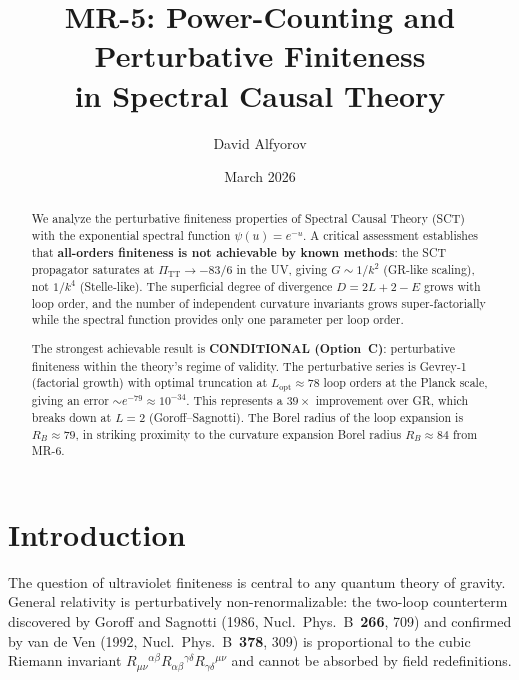 \documentclass[12pt,a4paper]{article}
\title{\textbf{MR-5: Power-Counting and Perturbative Finiteness\\
in Spectral Causal Theory}}
\author{David Alfyorov}
\date{March 2026}
\begin{document}
\maketitle
\begin{center}
\end{center}

\begin{abstract}
We analyze the perturbative finiteness properties of Spectral Causal Theory (SCT)
with the exponential spectral function $\psi(u) = e^{-u}$. A critical assessment
establishes that \textbf{all-orders finiteness is not achievable by known methods}:
the SCT propagator saturates at $\Pi_{\mathrm{TT}} \to -83/6$ in the UV, giving
$G \sim 1/k^2$ (GR-like scaling), not $1/k^4$ (Stelle-like). The superficial
degree of divergence $D = 2L + 2 - E$ grows with loop order, and the number of
independent curvature invariants grows super-factorially while the spectral
function provides only one parameter per loop order.

The strongest achievable result is \textbf{CONDITIONAL (Option~C)}: perturbative
finiteness within the theory's regime of validity. The perturbative series is
Gevrey-1 (factorial growth) with optimal truncation at $L_{\mathrm{opt}} \approx 78$
loop orders at the Planck scale, giving an error $\sim e^{-79} \approx 10^{-34}$.
This represents a $39\times$ improvement over GR, which breaks down at $L = 2$
(Goroff--Sagnotti). The Borel radius of the loop expansion is
$R_B \approx 79$, in striking proximity to the curvature expansion Borel
radius $R_B \approx 84$ from MR-6.
\end{abstract}

\tableofcontents
\newpage

\section{Introduction}
\label{sec:intro}

The question of ultraviolet finiteness is central to any quantum theory of gravity.
General relativity is perturbatively non-renormalizable: the two-loop counterterm
discovered by Goroff and Sagnotti (1986, Nucl.\ Phys.\ B~\textbf{266}, 709)
and confirmed by van de Ven (1992, Nucl.\ Phys.\ B~\textbf{378}, 309) is
proportional to the cubic Riemann invariant
$R_{\mu\nu}{}^{\alpha\beta} R_{\alpha\beta}{}^{\gamma\delta}
R_{\gamma\delta}{}^{\mu\nu}$ and cannot be absorbed by field redefinitions.
\end{document}
